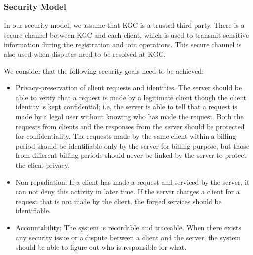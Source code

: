 \documentclass[letterpaper,12pt]{article}
\begin{document}
\subsubsection{Security Model}
In our security model, we assume that KGC is a trusted-third-party. There is a secure channel between KGC and each client, which is used to transmit sensitive information during the registration and join operations. This secure channel is also used when disputes need to be resolved at KGC.

We consider that the following security goals need to be achieved:
%
\begin{itemize}
\item Privacy-preservation of client requests and identities. The server should be able to verify that a request is made by a legitimate client though the client identity is kept confidential; i.e, the server is able to tell that a request is made by a legal user without knowing who has made the request. Both the requests from clients and the responses from the server should be protected for confidentiality. The requests made by the same client within a billing period should be identifiable only by the server for billing purpose, but those from different billing periods should never be linked by the server to protect the client privacy.

\item Non-repudiation: If a client has made a request and serviced by the server, it can not deny this activity in later time. If the server charges a client for a request that is not made by the client, the forged services should be identifiable.

\item Accountability:  The system is recordable and traceable. When there exists any security issue or a dispute between a client and the server, the system should be able to figure out who is responsible for what.
\end{itemize}

%
%
%
\end{document}
